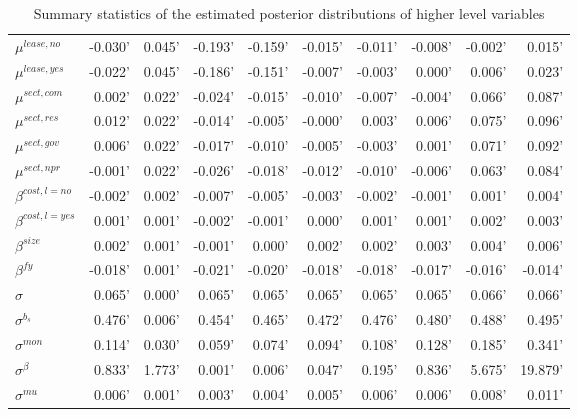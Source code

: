 \documentclass[12pt]{article}
\begin{document}
\begin{table}
\begin{tabular}{lrrrrrrrrr}
  $\mu^{lease, no}$   & -0.030' & 0.045' & -0.193' & -0.159' & -0.015' & -0.011' & -0.008' & -0.002' &  0.015' \\
  $\mu^{lease, yes}$   & -0.022' & 0.045' & -0.186' & -0.151' & -0.007' & -0.003' &  0.000' &  0.006' &  0.023' \\
  $\mu^{sect, com}$      &  0.002' & 0.022' & -0.024' & -0.015' & -0.010' & -0.007' & -0.004' &  0.066' &  0.087' \\
  $\mu^{sect, res}$       &  0.012' & 0.022' & -0.014' & -0.005' & -0.000' &  0.003' &  0.006' &  0.075' &  0.096' \\
  $\mu^{sect, gov}$       &  0.006' & 0.022' & -0.017' & -0.010' & -0.005' & -0.003' &  0.001' &  0.071' &  0.092' \\
  $\mu^{sect, npr}$      & -0.001' & 0.022' & -0.026' & -0.018' & -0.012' & -0.010' & -0.006' &  0.063' &  0.084' \\
  $\beta^{cost, l=no}$  & -0.002' & 0.002' & -0.007' & -0.005' & -0.003' & -0.002' & -0.001' &  0.001' &  0.004' \\
  $\beta^{cost, l=yes}$  &  0.001' & 0.001' & -0.002' & -0.001' &  0.000' &  0.001' &  0.001' &  0.002' &  0.003' \\
  $\beta^{size}$  &  0.002' & 0.001' & -0.001' &  0.000' &  0.002' &  0.002' &  0.003' &  0.004' &  0.006' \\
  $\beta^{fy}$    & -0.018' & 0.001' & -0.021' & -0.020' & -0.018' & -0.018' & -0.017' & -0.016' & -0.014' \\
  $\sigma$      &  0.065' & 0.000' &  0.065' &  0.065' &  0.065' &  0.065' &  0.065' &  0.066' &  0.066' \\
  $\sigma^{b_s}$    &  0.476' & 0.006' &  0.454' &  0.465' &  0.472' &  0.476' &  0.480' &  0.488' &  0.495' \\
  $\sigma^{mon}$   &  0.114' & 0.030' &  0.059' &  0.074' &  0.094' &  0.108' &  0.128' &  0.185' &  0.341' \\
  $\sigma^{\beta}$  &  0.833' & 1.773' &  0.001' &  0.006' &  0.047' &  0.195' &  0.836' &  5.675' & 19.879' \\
  $\sigma^{mu}$   &  0.006' & 0.001' &  0.003' &  0.004' &  0.005' &  0.006' &  0.006' &  0.008' &  0.011' \\
  \bottomrule
  \end{tabular}
\label{table:higher_level_params}
\caption{Summary statistics of the estimated posterior distributions of higher level variables}
\end{table}
\end{document}

